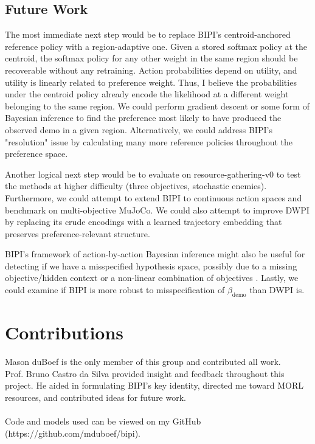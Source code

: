 \documentclass[11pt]{article}
\begin{document}
\subsection*{Future Work}

The most immediate next step would be to replace BIPI's centroid-anchored reference policy with a region-adaptive one. Given a stored softmax policy at the centroid, the softmax policy for any other weight in the same region should be recoverable without any retraining. Action probabilities depend on utility, and utility is linearly related to preference weight. Thus, I believe the probabilities under the centroid policy already encode the likelihood at a different weight belonging to the same region. We could perform gradient descent or some form of Bayesian inference to find the preference most likely to have produced the observed demo in a given region. Alternatively, we could address BIPI's "resolution" issue by calculating many more reference policies throughout the preference space.

Another logical next step would be to evaluate on resource-gathering-v0 to test the methods at higher difficulty (three objectives, stochastic enemies). Furthermore, we could attempt to extend BIPI to continuous action spaces and benchmark on multi-objective MuJoCo. We could also attempt to improve DWPI by replacing its crude encodings with a learned trajectory embedding that preserves preference-relevant structure.

BIPI's framework of action-by-action Bayesian inference might also be useful for detecting if we have a misspecified hypothesis space, possibly due to a missing objective/hidden context \cite{siththaranjan2024} or a non-linear combination of objectives \cite{bobu2018}. Lastly, we could examine if BIPI is more robust to misspecification of $\beta_{\text{demo}}$ than DWPI is.



\section*{Contributions}
Mason duBoef is the only member of this group and contributed all work.\\
Prof. Bruno Castro da Silva provided insight and feedback throughout this project. He aided in formulating BIPI's key identity, directed me toward MORL resources, and contributed ideas for future work.\\ \\
Code and models used can be viewed on my GitHub (https://github.com/mduboef/bipi).
\newpage
\end{document}
